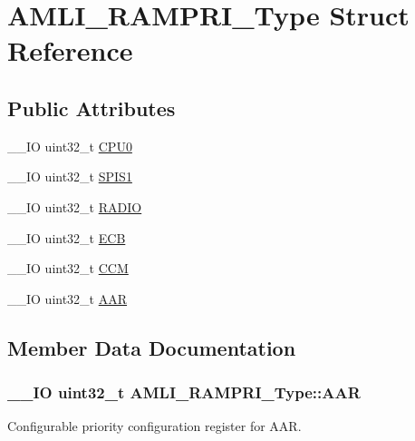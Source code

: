 \hypertarget{struct_a_m_l_i___r_a_m_p_r_i___type}{}\section{A\+M\+L\+I\+\_\+\+R\+A\+M\+P\+R\+I\+\_\+\+Type Struct Reference}
\label{struct_a_m_l_i___r_a_m_p_r_i___type}
\subsection*{Public Attributes}
\begin{DoxyCompactItemize}
\item 
\+\_\+\+\_\+\+I\+O uint32\+\_\+t \hyperlink{struct_a_m_l_i___r_a_m_p_r_i___type_a24f318f0a5da0b14195f00b01cb44e69}{C\+P\+U0}
\item 
\+\_\+\+\_\+\+I\+O uint32\+\_\+t \hyperlink{struct_a_m_l_i___r_a_m_p_r_i___type_a92854848d086cfe7e1239e0cb30316e4}{S\+P\+I\+S1}
\item 
\+\_\+\+\_\+\+I\+O uint32\+\_\+t \hyperlink{struct_a_m_l_i___r_a_m_p_r_i___type_a74bd58f9a1141c954a9922fb2945d24b}{R\+A\+D\+I\+O}
\item 
\+\_\+\+\_\+\+I\+O uint32\+\_\+t \hyperlink{struct_a_m_l_i___r_a_m_p_r_i___type_a85cfdf4e72c900e47d9cedfd40df6a81}{E\+C\+B}
\item 
\+\_\+\+\_\+\+I\+O uint32\+\_\+t \hyperlink{struct_a_m_l_i___r_a_m_p_r_i___type_ad1919e101695c6e9e8de0ded7fa51ff4}{C\+C\+M}
\item 
\+\_\+\+\_\+\+I\+O uint32\+\_\+t \hyperlink{struct_a_m_l_i___r_a_m_p_r_i___type_a963e366b8166fcc60ba6cbd42ba6adb0}{A\+A\+R}
\end{DoxyCompactItemize}


\subsection{Member Data Documentation}
\hypertarget{struct_a_m_l_i___r_a_m_p_r_i___type_a963e366b8166fcc60ba6cbd42ba6adb0}{}
\subsubsection[{A\+A\+R}]{\setlength{\rightskip}{0pt plus 5cm}\+\_\+\+\_\+\+I\+O uint32\+\_\+t A\+M\+L\+I\+\_\+\+R\+A\+M\+P\+R\+I\+\_\+\+Type\+::\+A\+A\+R}\label{struct_a_m_l_i___r_a_m_p_r_i___type_a963e366b8166fcc60ba6cbd42ba6adb0}
Configurable priority configuration register for A\+A\+R. \hypertarget{struct_a_m_l_i___r_a_m_p_r_i___type_ad1919e101695c6e9e8de0ded7fa51ff4}{}
